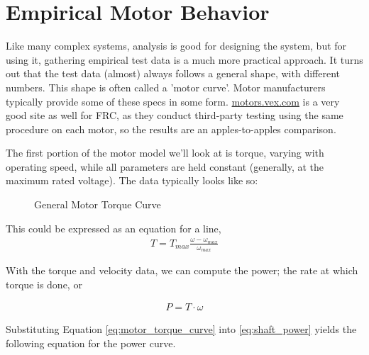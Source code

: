 \documentclass[10pt,letterpaper]{book}
\begin{document}

\section{Empirical Motor Behavior}

Like many complex systems, analysis is good for designing the system, but for using it, gathering empirical test data is a much more practical approach. It turns out that the test data (almost) always follows a general shape, with different numbers. This shape is often called a 'motor curve'. Motor manufacturers typically provide some of these specs in some form. \href{http://motors.vex.com}{\color{red}motors.vex.com} is a very good site as well for FRC, as they conduct third-party testing using the same procedure on each motor, so the results are an apples-to-apples comparison.


The first portion of the motor model we'll look at is torque, varying with operating speed, while all parameters are held constant (generally, at the maximum rated voltage). The data typically looks like so:

\begin{figure}[H] \centering \label{fig:motor_torque_curve}
\caption{General Motor Torque Curve}
\end{figure}

This could be expressed as an equation for a line,
\begin{align} \label{eq:motor_torque_curve}
  T = T_{max} \frac{\omega-\omega_{max}}{\omega_{max}}
\end{align}

With the torque and velocity data, we can compute the power; the rate at which torque is done, or

\begin{align} \label{eq:shaft_power}
  P = T \cdot \omega
\end{align}

Substituting Equation \ref{eq:motor_torque_curve} into \ref{eq:shaft_power} yields the following equation for the power curve.
\end{document}
